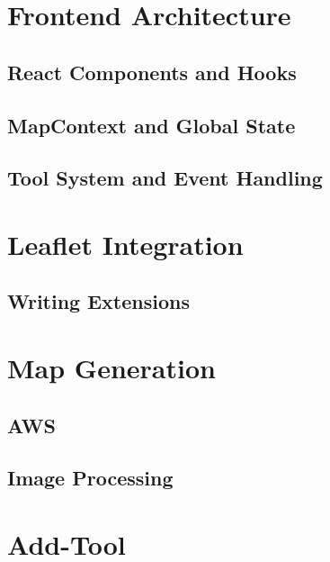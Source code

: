 \section{Frontend Architecture}

\subsection{React Components and Hooks}

\subsection{MapContext and Global State}

\subsection{Tool System and Event Handling}

\section{Leaflet Integration}

\subsection{Writing Extensions}

\section{Map Generation}


\subsection{AWS}

\subsection{Image Processing}

\section{Add-Tool}

